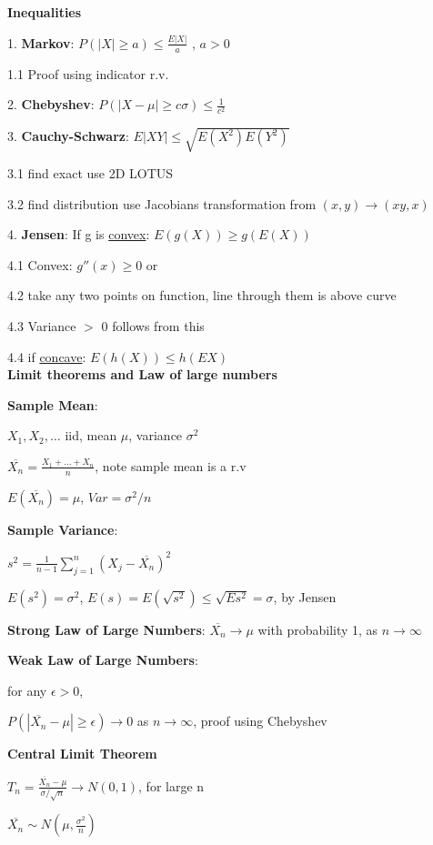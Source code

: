 \documentclass[10pt, a4paper]{article}
\newcommand{\header}[1]{{\normalsize\textbf{#1}}}
\newcommand{\tab}[0]{\hspace*{2mm}}
\begin{document}
\begin{multicols*}{3}
		\header{Inequalities}

		1. \textbf{Markov}: $P(|X| \geq a) \leq \frac{E|X|}{a}$ , $a > 0$

		\tab{} 1.1 Proof using indicator r.v.

		2. \textbf{Chebyshev}: $P(|X - \mu| \geq c \sigma) \leq \frac{1}{c^2}$

		3. \textbf{Cauchy-Schwarz}: $E|XY| \leq \sqrt{E(X^2)E(Y^2)}$

		\tab{} 3.1 find exact use 2D LOTUS
		
		\tab{} 3.2 find distribution use Jacobians transformation from $(x,y) \rightarrow (xy, x)$

		4. \textbf{Jensen}: If g is \underline{convex}: $E(g(X)) \geq g(E(X))$

		\tab{} 4.1 Convex: $g''(x) \geq 0$ or

		\tab{} 4.2 take any two points on function, line through them is above curve

		\tab{} 4.3 Variance $>$ 0 follows from this 

		\tab{} 4.4 if \underline{concave}: $E(h(X)) \leq h(EX)$\\

		\header{Limit theorems and Law of large numbers}

		\textbf{Sample Mean}:

		$X_1, X_2, \dots$ iid, mean $\mu$, variance $\sigma ^2$

		$\overline{X_n} = \frac{X_1 + \dots + X_n}{n}$, note sample mean is a r.v

		$E(\overline{X_n}) = \mu$, $Var = \sigma^2 / n$

		\textbf{Sample Variance}: 

		$s^2 = \frac{1}{n -1}\sum_{j = 1}^{n}(X_j - \overline{X_n})^2$

		$E(s^2) = \sigma^2$, $E(s) = E(\sqrt{s^2}) \leq \sqrt{Es^2} = \sigma$, by Jensen

		\textbf{Strong Law of Large Numbers}: $\overline{X_n} \rightarrow \mu$ with probability 1, as $n \rightarrow \infty$

		\textbf{Weak Law of Large Numbers}: 

		for any $\epsilon > 0$, 

		$P(|\overline{X_n} - \mu| \geq \epsilon) \rightarrow 0$ as $n \rightarrow \infty$, proof using Chebyshev

		\textbf{Central Limit Theorem}

		$T_n = \frac{\overline{X_n} - \mu}{\sigma / \sqrt{n}} \rightarrow N(0, 1)$, for large n

		$\overline{X_n} \sim N(\mu, \frac{\sigma^2}{n})$
		










	\end{multicols*}
\end{document}
